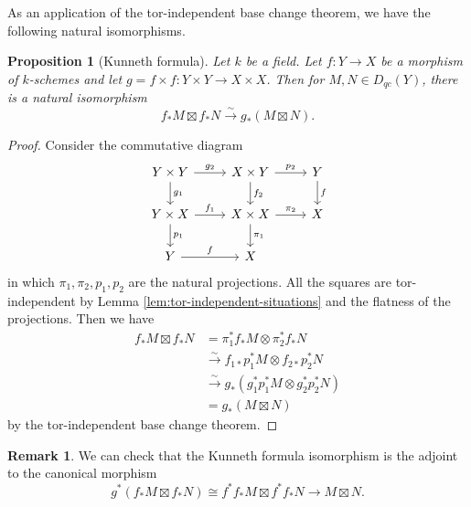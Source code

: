 \documentclass{amsart}
\numberwithin{equation}{section}
\theoremstyle{plain}
\newtheorem{proposition}[theorem]{Proposition}
\theoremstyle{definition}
\newtheorem{remark}[theorem]{Remark}
\DeclareMathOperator{\id}{\mathrm{id}}
\begin{document}
As an application of the tor-independent base change theorem, we have the following natural isomorphisms.
\begin{proposition}[Kunneth formula]
    Let $k$ be a field.
    Let $f \colon Y \to X$ be a morphism of $k$-schemes and let $g = f\times f \colon Y \times Y \to X \times X$.
    Then for $M, N \in D_{qc}(Y)$, there is a natural isomorphism
    \begin{equation}
        f_*M \boxtimes f_*N \xrightarrow{\sim} g_*(M \boxtimes N).
    \end{equation}
\end{proposition}
\begin{proof}
    Consider the commutative diagram
    \[
        \begin{tikzcd}
            Y\times Y \arrow[r,"g_2"]\arrow[d, "g_1"] & X\times Y \arrow[d,"f_2"] \arrow[r, "p_2"] &Y\arrow[d, "f"]\\
            Y \times X \arrow[r, "f_1"]\arrow[d, "p_1"]& X \times X \arrow[r, "\pi_2"]\arrow[d, "\pi_1"]&X\\
            Y \arrow[r, "f"]&X&
        \end{tikzcd}
    \]
    in which $\pi_1, \pi_2, p_1, p_2$ are the natural projections.
    All the squares are tor-independent by Lemma \ref{lem:tor-independent-situations} and the flatness of the projections.
    Then we have
    \begin{align*}
        f_*M \boxtimes f_*N & = \pi_1^*f_*M \otimes \pi_2^*f_*N                      \\
                            & \xrightarrow{\sim} f_{1*}p_1^*M \otimes f_{2*}p_2^*N   \\
                            & \xrightarrow{\sim}g_*(g_1^*p_1^*M \otimes g_2^*p_2^*N) \\
                            & = g_*(M \boxtimes N)
    \end{align*}
    by the tor-independent base change theorem.
\end{proof}
\begin{remark}
    We can check that the Kunneth formula isomorphism is the adjoint to the canonical morphism
    \begin{equation}
        g^*(f_*M \boxtimes f_*N) \cong f^*f_*M \boxtimes f^*f_*N \to M \boxtimes N.
    \end{equation}
\end{remark}
\end{document}
